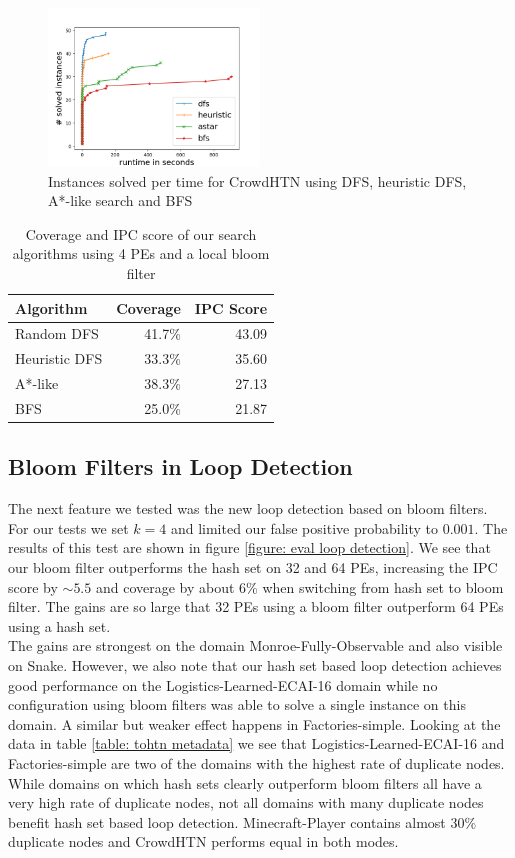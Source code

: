 \begin{figure}[!hbp]
	\caption{Instances solved per time for CrowdHTN using DFS, heuristic DFS, A*-like search and BFS}
	\label{figure: eval algorithm}
	\centering
	\includegraphics[width=0.5\textwidth]{images/final/search_algorithms.png}
\end{figure}
\begin{table}[!hbp]
	\caption{Coverage and IPC score of our search algorithms using 4 PEs and a local bloom filter}
	\label{table: eval algorithm}
	\centering
	\begin{tabular}{| l | r | r |}
		\hline
		Algorithm 		& Coverage & IPC Score \\
		\hline
		Random DFS 		& 41.7\%	& 43.09 \\ %
		Heuristic DFS 	& 33.3\%	& 35.60	\\ %
		A*-like 		& 38.3\%	& 27.13 \\ %
		BFS 			& 25.0\%	& 21.87	\\ %
		\hline
	\end{tabular}
\end{table}

\subsection{Bloom Filters in Loop Detection}
\label{eval: loop detection}
The next feature we tested was the new loop detection based on bloom filters. For our tests we set $k=4$ and limited our false positive probability to $0.001$. The results of this test are shown in figure \ref{figure: eval loop detection}. We see that our bloom filter outperforms the hash set on 32 and 64 PEs, increasing the IPC score by $\sim 5.5$ and coverage by about 6\% when switching from hash set to bloom filter. The gains are so large that 32 PEs using a bloom filter outperform 64 PEs using a hash set. \\
The gains are strongest on the domain Monroe-Fully-Observable and also visible on Snake.
However, we also note that our hash set based loop detection achieves good performance on the Logistics-Learned-ECAI-16 domain while no configuration using bloom filters was able to solve a single instance on this domain. A similar but weaker effect happens in Factories-simple.
Looking at the data in table \ref{table: tohtn metadata} we see that Logistics-Learned-ECAI-16 and Factories-simple are two of the domains with the highest rate of duplicate nodes. While domains on which hash sets clearly outperform bloom filters all have a very high rate of duplicate nodes, not all domains with many duplicate nodes benefit hash set based loop detection. Minecraft-Player contains almost 30\% duplicate nodes and CrowdHTN performs equal in both modes.

